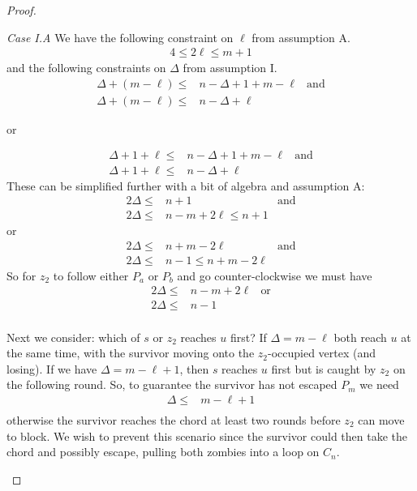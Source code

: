 \begin{proof}
\begin{proofpart}
  \textit{Case I.A} We have the following constraint on $\ell$ from
  assumption A.
  \begin{align*}
   4 \leq 2 \ell \leq m + 1
  \end{align*}
  and the following constraints on $\Delta$ from assumption I.
  \begin{align*}
   \Delta + (m - \ell) \leq & n - \Delta + 1 + m - \ell & \text{and} \\
   \Delta + (m - \ell) \leq & n - \Delta + \ell
  \end{align*}
  \begin{center}or\end{center}
  \begin{align*}
   \Delta + 1 + \ell \leq & n - \Delta + 1 + m - \ell & \text{and} \\
   \Delta + 1 + \ell \leq & n - \Delta + \ell
  \end{align*}
  These can be simplified further with a bit of algebra and  assumption A:
  \begin{align*}
   2 \Delta \leq & n+1                    & \text{and} \\
   2 \Delta \leq & n - m + 2\ell \leq n+1
  \end{align*}
  or
  \begin{align*}
   2 \Delta \leq & n+m -2 \ell             & \text{and} \\
   2 \Delta \leq & n -1 \leq n + m - 2\ell
  \end{align*}
  So for $z_2$ to follow either $P_a$ or $P_b$ and go counter-clockwise we must have
  \begin{align*}
   2 \Delta \leq & n - m + 2\ell & \text{or} \\
   2 \Delta \leq & n - 1                     \\
  \end{align*}

  Next we consider: which of $s$ or $z_2$ reaches $u$ first?
  If $\Delta = m - \ell$ both reach $u$ at the same time, with the survivor moving onto the $z_2$-occupied vertex (and losing).
  If we have $\Delta = m - \ell + 1$, then $s$ reaches $u$ first
  but is caught by $z_2$ on the following round.
  So, to guarantee the survivor has not escaped $P_m$ we need
  \begin{align*}
   \Delta \leq & m- \ell + 1 \\
  \end{align*}
  otherwise the survivor reaches the chord at least two rounds
  before $z_2$ can move to block. We wish to prevent this scenario since
  the survivor could then take the chord and possibly escape, pulling
  both zombies into a loop on $C_{n}$.


\end{proofpart}
\end{proof}
